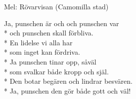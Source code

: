 \begin{SongText}
    \begin{SongInfo}
        Mel: Rövarvisan (Camomilla stad)
    \end{SongInfo}
    \begin{SongVerse}
        Ja, punschen är och och punschen var\\*%
        och punschen skall förbliva.\\*%
        En lidelse vi alla har\\*%
        som inget kan fördriva.\\*%
        Ja punschen tinar opp, såväl\\*%
        som svalkar både kropp och själ.\\*%
        Den botar begären och lindrar besvären.\\*%
        Ja, punschen den gör både gott och väl!
    \end{SongVerse}
\end{SongText}